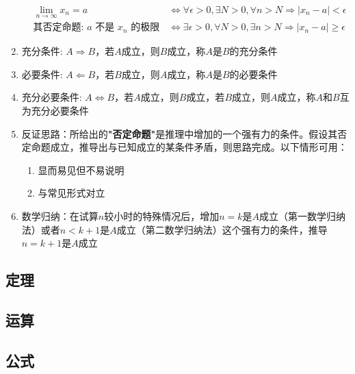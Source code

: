 \documentclass[a4paper,12pt]{article}
\begin{document}
\begin{enumerate}
        \begin{align*}
            & \lim\limits_{n \to \infty} x_n = a &\Leftrightarrow \forall \epsilon > 0, \exists N > 0, \forall n > N \Rightarrow |x_n - a| < \epsilon \\[6pt]
            & \text{其否定命题: } a \text{ 不是 } x_n \text{ 的极限 } &\Leftrightarrow \exists \epsilon > 0, \forall N > 0, \exists n > N \Rightarrow |x_n - a| \ge \epsilon
        \end{align*}
        \item 充分条件: $A \Rightarrow B$，若$A$成立，则$B$成立，称$A$是$B$的充分条件
        \item 必要条件: $A \Leftarrow B$，若$B$成立，则$A$成立，称$A$是$B$的必要条件
        \item 充分必要条件: $A \Leftrightarrow B$，若$A$成立，则$B$成立，若$B$成立，则$A$成立，称$A$和$B$互为充分必要条件
        \item 反证思路：所给出的\textbf{"否定命题"}是推理中增加的一个强有力的条件。假设其否定命题成立，推导出与已知成立的某条件矛盾，则思路完成。以下情形可用：
        \begin{enumerate}
            \item 显而易见但不易说明
            \item 与常见形式对立
        \end{enumerate}
        \item 数学归纳：在试算$n$较小时的特殊情况后，增加$n=k$是$A$成立（第一数学归纳法）或者$n<k+1$是$A$成立（第二数学归纳法）这个强有力的条件，推导$n=k+1$是$A$成立
    \end{enumerate}

    \subsection{定理}

    \begin{enumerate}
    \end{enumerate}

    \subsection{运算}

    \begin{enumerate}

    \end{enumerate}

    \subsection{公式}
\end{document}
